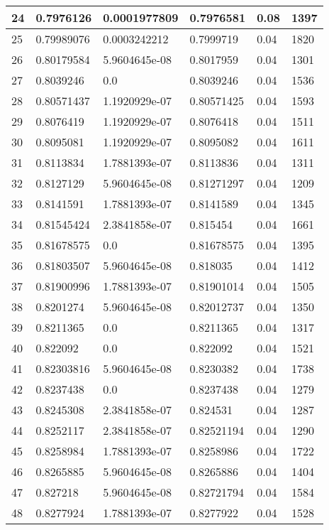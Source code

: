 \begin{longtable}{|l|l|l|l|l|l|}
24 & 0.7976126 & 0.0001977809 & 0.7976581 & 0.08 & 1397 \\ \hline 
25 & 0.79989076 & 0.0003242212 & 0.7999719 & 0.04 & 1820 \\ \hline 
26 & 0.80179584 & 5.9604645e-08 & 0.8017959 & 0.04 & 1301 \\ \hline 
27 & 0.8039246 & 0.0 & 0.8039246 & 0.04 & 1536 \\ \hline 
28 & 0.80571437 & 1.1920929e-07 & 0.80571425 & 0.04 & 1593 \\ \hline 
29 & 0.8076419 & 1.1920929e-07 & 0.8076418 & 0.04 & 1511 \\ \hline 
30 & 0.8095081 & 1.1920929e-07 & 0.8095082 & 0.04 & 1611 \\ \hline 
31 & 0.8113834 & 1.7881393e-07 & 0.8113836 & 0.04 & 1311 \\ \hline 
32 & 0.8127129 & 5.9604645e-08 & 0.81271297 & 0.04 & 1209 \\ \hline 
33 & 0.8141591 & 1.7881393e-07 & 0.8141589 & 0.04 & 1345 \\ \hline 
34 & 0.81545424 & 2.3841858e-07 & 0.815454 & 0.04 & 1661 \\ \hline 
35 & 0.81678575 & 0.0 & 0.81678575 & 0.04 & 1395 \\ \hline 
36 & 0.81803507 & 5.9604645e-08 & 0.818035 & 0.04 & 1412 \\ \hline 
37 & 0.81900996 & 1.7881393e-07 & 0.81901014 & 0.04 & 1505 \\ \hline 
38 & 0.8201274 & 5.9604645e-08 & 0.82012737 & 0.04 & 1350 \\ \hline 
39 & 0.8211365 & 0.0 & 0.8211365 & 0.04 & 1317 \\ \hline 
40 & 0.822092 & 0.0 & 0.822092 & 0.04 & 1521 \\ \hline 
41 & 0.82303816 & 5.9604645e-08 & 0.8230382 & 0.04 & 1738 \\ \hline 
42 & 0.8237438 & 0.0 & 0.8237438 & 0.04 & 1279 \\ \hline 
43 & 0.8245308 & 2.3841858e-07 & 0.824531 & 0.04 & 1287 \\ \hline 
44 & 0.8252117 & 2.3841858e-07 & 0.82521194 & 0.04 & 1290 \\ \hline 
45 & 0.8258984 & 1.7881393e-07 & 0.8258986 & 0.04 & 1722 \\ \hline 
46 & 0.8265885 & 5.9604645e-08 & 0.8265886 & 0.04 & 1404 \\ \hline 
47 & 0.827218 & 5.9604645e-08 & 0.82721794 & 0.04 & 1584 \\ \hline 
48 & 0.8277924 & 1.7881393e-07 & 0.8277922 & 0.04 & 1528 \\ \hline 

\end{longtable}
